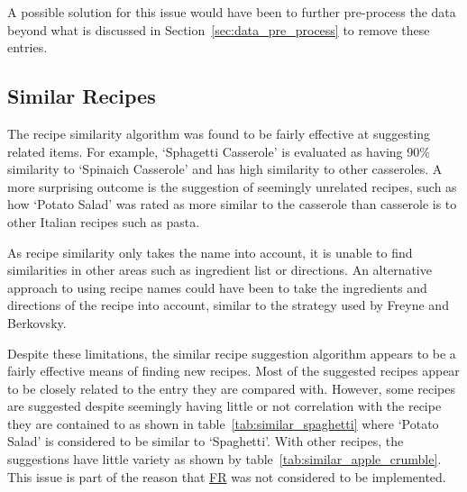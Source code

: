 A possible solution for this issue would have been to further pre-process the
data beyond what is discussed in Section~\ref{sec:data_pre_process} to remove
these entries.

\subsection{Similar Recipes}

The recipe similarity algorithm was found to be fairly effective at suggesting related items.
For example, \enquote*{Sphagetti Casserole} is evaluated as having 90\% similarity to
\enquote*{Spinaich Casserole} and has high similarity to other casseroles. A more surprising
outcome is the suggestion of seemingly unrelated recipes, such as how \enquote*{Potato Salad}
was rated as more similar to the casserole than casserole is to other Italian recipes such as
pasta.

As recipe similarity only takes the name into account, it is unable to find similarities
in other areas such as ingredient list or directions. An alternative approach to using
recipe names could have been to take the ingredients and directions of the recipe into account,
similar to the strategy used by Freyne and Berkovsky.~\cite{freyne_intelligent_2010}

Despite these limitations, the similar recipe suggestion algorithm appears to be a fairly effective
means of finding new recipes. Most of the suggested recipes appear to be closely related to the entry they are
compared with. However, some recipes are suggested despite seemingly having little or not correlation with the
recipe they are contained to as shown in table~\ref{tab:similar_spaghetti} where \enquote*{Potato Salad} is considered
to be similar to \enquote*{Spaghetti}. With other recipes, the suggestions have little variety as shown by
table~\ref{tab:similar_apple_crumble}. This issue is part of the reason that
\hyperref[req:too_similar]{FR} was not considered to be implemented.

